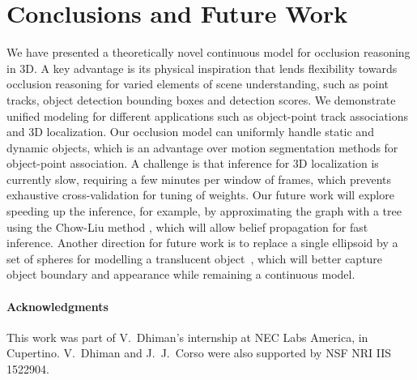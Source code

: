 \section{Conclusions and Future Work}
\label{sec:conclusions}

We have presented a theoretically novel continuous model for occlusion reasoning in 3D. A key advantage is its physical inspiration that lends flexibility towards occlusion reasoning for varied elements of scene understanding, such as point tracks, object detection bounding boxes and detection scores. We demonstrate unified modeling for different applications such as object-point track associations and 3D localization. Our occlusion model can uniformly handle static and dynamic objects, which is an advantage over motion segmentation methods for object-point association. A challenge is that inference for 3D localization is currently slow, requiring a few minutes per window of frames, which prevents exhaustive cross-validation for tuning of weights. Our future work will explore speeding up the inference, for example, by approximating the graph with a tree using the Chow-Liu method \cite{chow1968approximating}, which will allow belief propagation for fast inference. Another direction for future work is to replace a single ellipsoid by a set of spheres for modelling a translucent object~\cite{Rhodin2015}, which will better capture object boundary and appearance while remaining a continuous model.

\vspace{-0.2cm}
\paragraph{Acknowledgments}
This work was part of V.~Dhiman's internship at NEC Labs America, in Cupertino. V.~Dhiman and J.~J.~Corso were also supported by NSF NRI IIS 1522904.


